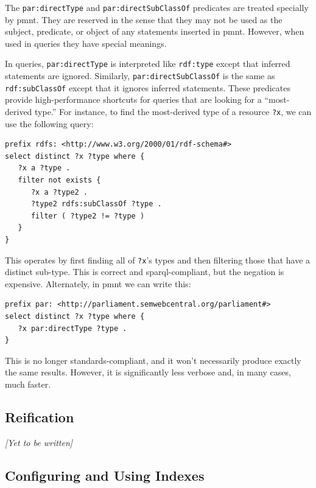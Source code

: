 The \verb|par:directType| and \verb|par:directSubClassOf| predicates are treated specially by \ac{pmnt}.  They are reserved in the sense that they may not be used as the subject, predicate, or object of any  statements inserted in \ac{pmnt}.  However, when used in queries they have special meanings.

In queries, \verb|par:directType| is interpreted like \verb|rdf:type| except that inferred statements are ignored.  Similarly, \verb|par:directSubClassOf| is the same as \verb|rdf:subClassOf| except that it ignores inferred statements.  These predicates provide high-performance shortcuts for queries that are looking for a ``most-derived type.''  For instance, to find the most-derived type of a resource \verb|?x|, we can use the following query:

{\small\begin{verbatim}
prefix rdfs: <http://www.w3.org/2000/01/rdf-schema#>
select distinct ?x ?type where {
   ?x a ?type .
   filter not exists {
      ?x a ?type2 .
      ?type2 rdfs:subClassOf ?type .
      filter ( ?type2 != ?type )
   }
}
\end{verbatim}}

This operates by first finding all of \verb|?x|'s types and then filtering those that have a distinct sub-type.  This is correct and \ac{sparql}-compliant, but the negation is expensive.  Alternately, in \ac{pmnt} we can write this:

{\small\begin{verbatim}
prefix par: <http://parliament.semwebcentral.org/parliament#>
select distinct ?x ?type where {
   ?x par:directType ?type .
}
\end{verbatim}}

This is no longer standards-compliant, and it won't necessarily produce exactly the same results.  However, it is significantly less verbose and, in many cases, much faster.

\subsection{Reification}
\label{section-reification}

\emph{[Yet to be written]}

\subsection{Configuring and Using Indexes}
\label{section-indexes}

